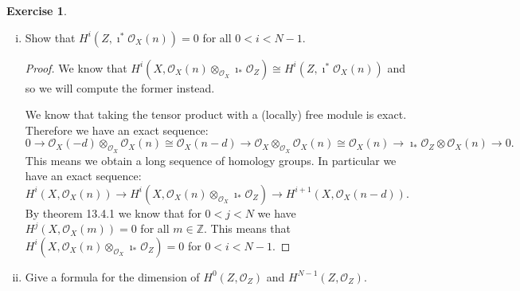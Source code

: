 \documentclass{article}
\newcommand{\Z}{\mathbb{Z}}
\newcommand{\sheaf}{\mathcal{O}}
\newcommand{\FF}{\mathcal{F}}
\newcommand{\incl}{\imath}
\theoremstyle{definition}
\newtheorem{question}{Exercise}
\begin{document}
\begin{question}
\begin{enumerate}[(i)]
              \begin{proof}
                  We know that
                  \(\incl_{*}\incl^{*}\FF\cong\FF\otimes_{\sheaf_{X}}\incl_{*}\sheaf_{Z}\)
                  and so we have
                  \begin{align*}
                      H^{i}(X,\sheaf_{X}(n)\otimes_{\sheaf_{X}}\incl_{*}\sheaf_{Z}) & \cong H^{i}(X,\incl_{*}\incl^{*}\FF) \\
                                                                                    & \cong H^{i}(Z,\incl^{*}\FF)
                  \end{align*}
                  by Exercise 12.9 below.
              \end{proof}

        \item Show that \(H^{i}(Z,\incl^{*}\sheaf_{X}(n))=0\) for all
              \(0<i<N-1\).

              \begin{proof}
                  We know that
                  \(H^{i}(X,\sheaf_{X}(n)\otimes_{\sheaf_{X}}\incl_{*}\sheaf_{Z})\cong
                  H^{i}(Z,\incl^{*}\sheaf_{X}(n))\) and so we will compute the
                  former instead.

                  We know that taking the tensor product with a (locally) free
                  module is exact. Therefore we have an exact sequence:
                  \[
                      0\to\sheaf_{X}(-d)\otimes_{\sheaf_{X}}\sheaf_{X}(n)\cong\sheaf_{X}(n-d)\to\sheaf_{X}\otimes_{\sheaf_{X}}\sheaf_{X}(n)\cong\sheaf_{X}(n)\to\incl_{*}\sheaf_{Z}\otimes\sheaf_{X}(n)\to 0.
                  \]
                  This means we obtain a long sequence of homology groups. In
                  particular we have an exact sequence:
                  \[
                      H^{i}(X,\sheaf_{X}(n))\to H^{i}(X,\sheaf_{X}(n)\otimes_{\sheaf_{X}}\incl_{*}\sheaf_{Z})\to H^{i+1}(X,\sheaf_{X}(n-d)).
                  \]
                  By theorem 13.4.1 we know that for \(0<j<N\) we have
                  \(H^{j}(X,\sheaf_{X}(m))=0\) for all \(m\in\Z\). This means
                  that
                  \(H^{i}(X,\sheaf_{X}(n)\otimes_{\sheaf_{X}}\incl_{*}\sheaf_{Z})=0\)
                  for \(0<i<N-1\).
              \end{proof}

        \item Give a formula for the dimension of \(H^{0}(Z,\sheaf_{Z})\) and
              \(H^{N-1}(Z,\sheaf_{Z})\).


\end{enumerate}
\end{question}
\end{document}

